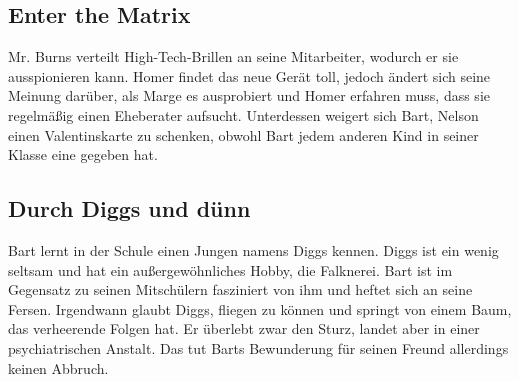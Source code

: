 
\subsection{Enter the Matrix}\label{SABF06}
Mr. Burns verteilt High-Tech-Brillen an seine Mitarbeiter, wodurch er sie ausspionieren kann. Homer findet das neue Gerät toll, jedoch ändert sich seine Meinung darüber, als Marge es ausprobiert und Homer erfahren muss, dass sie regelmäßig einen Eheberater aufsucht. Unterdessen weigert sich Bart, Nelson einen Valentinskarte zu schenken, obwohl Bart jedem anderen Kind in seiner Klasse eine gegeben hat.


\subsection{Durch Diggs und dünn}
Bart lernt in der Schule einen Jungen namens Diggs kennen. Diggs ist ein wenig seltsam und hat ein außergewöhnliches Hobby, die Falknerei. Bart ist im Gegensatz zu seinen Mitschülern fasziniert von ihm und heftet sich an seine Fersen. Irgendwann glaubt Diggs, fliegen zu können und springt von einem Baum, das verheerende Folgen hat. Er überlebt zwar den Sturz, landet aber in einer psychiatrischen Anstalt. Das tut Barts Bewunderung für seinen Freund allerdings keinen Abbruch.

